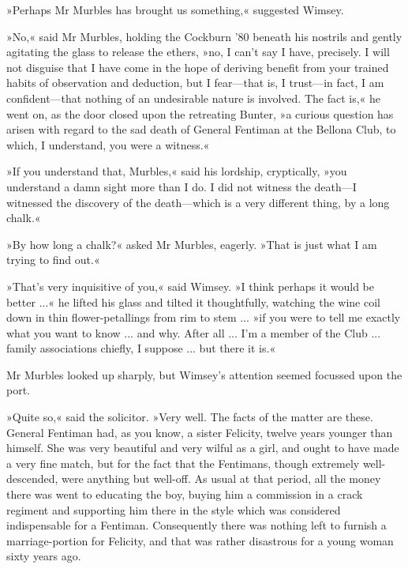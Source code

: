 »Perhaps Mr Murbles has brought us something,« suggested Wimsey.

»No,« said Mr Murbles, holding the Cockburn '80 beneath his nostrils and gently agitating the glass to release the ethers, »no, I can't say I have, precisely. I will not disguise that I have come in the hope of deriving benefit from your trained habits of observation and deduction, but I fear\allowbreak---\allowbreak that is, I trust\allowbreak---\allowbreak in fact, I am confident\allowbreak---\allowbreak that nothing of an undesirable nature is involved. The fact is,« he went on, as the door closed upon the retreating Bunter, »a curious question has arisen with regard to the sad death of General Fentiman at the Bellona Club, to which, I understand, you were a witness.«

»If you understand that, Murbles,« said his lordship, cryptically, »you understand a damn sight more than I do. I did not witness the death\allowbreak---\allowbreak I witnessed the discovery of the death\allowbreak---\allowbreak which is a very different thing, by a long chalk.«

»By how long a chalk?« asked Mr Murbles, eagerly. »That is just what I am trying to find out.«

»That's very inquisitive of you,« said Wimsey. »I think perhaps it would be better ...« he lifted his glass and tilted it thoughtfully, watching the wine coil down in thin flower-petallings from rim to stem ... »if you were to tell me exactly what you want to know ... and why. After all ... I'm a member of the Club ... family associations chiefly, I suppose ... but there it is.«

Mr Murbles looked up sharply, but Wimsey's attention seemed focussed upon the port.

»Quite so,« said the solicitor. »Very well. The facts of the matter are these. General Fentiman had, as you know, a sister Felicity, twelve years younger than himself. She was very beautiful and very wilful as a girl, and ought to have made a very fine match, but for the fact that the Fentimans, though extremely well-descended, were anything but well-off. As usual at that period, all the money there was went to educating the boy, buying him a commission in a crack regiment and supporting him there in the style which was considered indispensable for a Fentiman. Consequently there was nothing left to furnish a marriage-portion for Felicity, and that was rather disastrous for a young woman sixty years ago.

